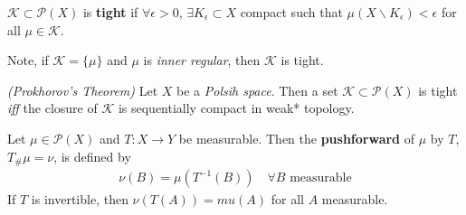 \documentclass[12pt,a4paper]{article}
\begin{document}
 $\mathscr{K} \subset \mathscr{P}(X)$ is \textbf{tight} if $\forall \epsilon >0$, $\exists K_{\epsilon} \subset X$ compact such that $\mu(X \backslash K_{\epsilon}) <\epsilon$ for all $\mu \in \mathscr{K}$.

\quad Note, if $\mathscr{K} = \{\mu\}$ and $\mu$ is \emph{inner regular}, then $\mathscr{K}$ is tight. 
\s

 \emph{(Prokhorov's Theorem)} Let $X$ be a \emph{Polsih space}. Then a set $\mathscr{K} \subset \mathscr{P}(X)$ is tight \textit{iff} the closure of $\mathscr{K}$ is sequentially compact in weak* topology.
\s

 Let $\mu\in \mathscr{P}(X)$ and $T: X\rightarrow Y$ be measurable. Then the \textbf{pushforward} of $\mu$ by $T$, $T_{\#} \mu = \nu$, is defined by
\begin{align*}
\nu(B) = \mu(T^{-1}(B)) \quad \forall B \text{ measurable}
\end{align*}
If $T$ is invertible, then $\nu(T(A))= mu(A)$ for all $A$ measurable.
\s
\end{document}

